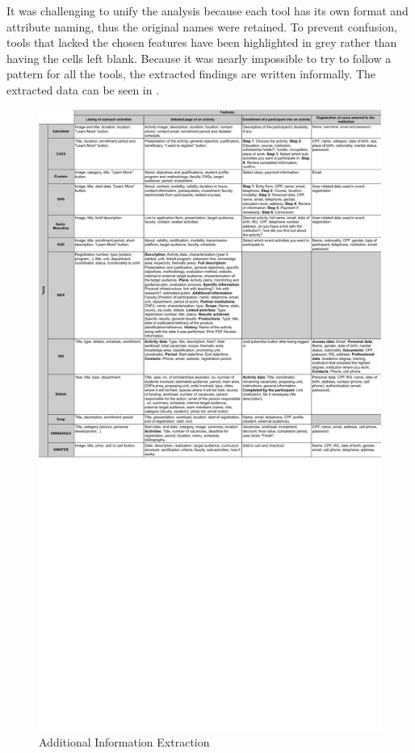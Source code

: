 It was challenging to unify the analysis because each tool has its own format and attribute naming, thus the original names were retained. To prevent confusion, tools that lacked the chosen features have been highlighted in grey rather than having the cells left blank. Because it was nearly impossible to try to follow a pattern for all the tools, the extracted findings are written informally. The extracted data can be seen in .

\begin{figure}[!htb]
  \caption{Additional Information Extraction}\label{fig:gl-additional-extraction}
  \begin{center}
    \includegraphics[width=16cm]{img/4-data-extraction-2.pdf}
  \end{center}
\end{figure}

